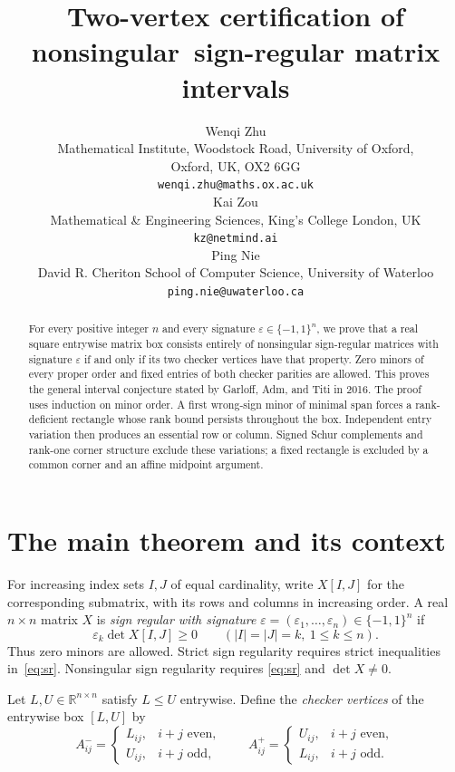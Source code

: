 \documentclass[11pt]{article}
\title{Two-vertex certification of nonsingular\ sign-regular matrix intervals}
\author{%
Wenqi Zhu\\
{\small Mathematical Institute, Woodstock Road, University of Oxford,}\\
{\small Oxford, UK, OX2 6GG}\\
{\small\texttt{wenqi.zhu@maths.ox.ac.uk}}\\[1ex]
Kai Zou\\
{\small Mathematical \& Engineering Sciences, King's College London, UK}\\
{\small\texttt{kz@netmind.ai}}\\[1ex]
Ping Nie\\
{\small David R. Cheriton School of Computer Science, University of Waterloo}\\
{\small\texttt{ping.nie@uwaterloo.ca}}}
\date{}
\theoremstyle{definition}
\theoremstyle{remark}
\numberwithin{equation}{section}
\newcommand{\R}{\mathbb R}
\newcommand{\eps}{\varepsilon}
\begin{document}
\maketitle
\begin{abstract}
For every positive integer $n$ and every signature
$\eps\in\{-1,1\}^n$, we prove that a real square entrywise matrix box
consists entirely of nonsingular sign-regular matrices with signature
$\eps$ if and only if its two checker vertices have that property.
Zero minors of every proper order and fixed entries of both checker
parities are allowed. This proves the general interval conjecture
stated by Garloff, Adm, and Titi in 2016. The proof uses induction on
minor order. A first wrong-sign minor of minimal span forces a
rank-deficient rectangle whose rank bound persists throughout the box.
Independent entry variation then produces an essential row or column.
Signed Schur complements and rank-one corner structure exclude these
variations; a fixed rectangle is excluded by a common corner and an
affine midpoint argument.
\end{abstract}

\section{The main theorem and its context}\label{sec:intro}

For increasing index sets $I,J$ of equal cardinality, write $X[I,J]$
for the corresponding submatrix, with its rows and columns in increasing
order. A real $n\times n$ matrix $X$ is \emph{sign regular with
signature} $\eps=(\eps_1,\ldots,\eps_n)\in\{-1,1\}^n$ if
\begin{equation}\label{eq:sr}
  \eps_k\det X[I,J]\geq0
  \qquad (|I|=|J|=k,\ 1\leq k\leq n).
\end{equation}
Thus zero minors are allowed. Strict sign regularity requires strict
inequalities in~\eqref{eq:sr}. Nonsingular sign regularity requires
\eqref{eq:sr} and $\det X\neq0$.

Let $L,U\in\R^{n\times n}$ satisfy $L\leq U$ entrywise. Define the
\emph{checker vertices} of the entrywise box $[L,U]$ by
\begin{equation}\label{eq:vertices}
 A^-_{ij}=\begin{cases}L_{ij},&i+j\text{ even},\\U_{ij},&i+j\text{ odd},\end{cases}
 \qquad
 A^+_{ij}=\begin{cases}U_{ij},&i+j\text{ even},\\L_{ij},&i+j\text{ odd}.
 \end{cases}
\end{equation}
\end{document}
